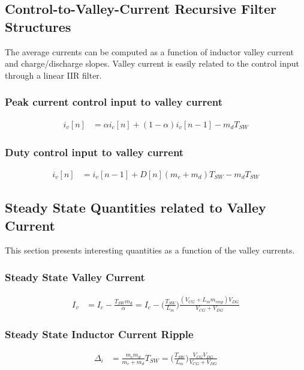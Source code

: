 \documentclass{scrartcl}
\begin{document}
		\subsection{Control-to-Valley-Current Recursive Filter Structures}
		The average currents can be computed as a function of inductor valley current and charge/discharge slopes.  Valley current is easily related to the control input through a linear IIR filter.
		\subsubsection{Peak current control input to valley current}
			\begin{align}
			i_v[n] &=  \alpha i_c[n] + ( 1 - \alpha ) i_v [n-1] - m_dT_{SW}    \label{ivn_cpm}
			\end{align}
		
		\subsubsection{Duty control input to valley current}
			\begin{align}
			i_v[n] &= i_v[n-1] +  D[n](m_c+m_d)T_{SW} - m_dT_{SW}  \label{ivn_dc}	
			\end{align}		
		

	\subsection{Steady State Quantities related to Valley Current}
	This section presents interesting quantities as a function of the valley currents.
	
		\subsubsection{Steady State Valley Current}
			\begin{align}
			I_{v} &=  I_{c} - \frac{T_{SW}m_d} {\alpha} =
			I_c - \bigg(\frac{T_{SW}} {L_m}\bigg) \frac{(V_{CG}+L_m m_{cmp})V_{DG} }{V_{CG}+V_{DG}} \label{ic_to_iv}
			\end{align}
			
		\subsubsection{Steady State Inductor Current Ripple}
			\begin{align}
			\Delta_i &=  \frac{m_c m_d}{m_c + m_d} T_{SW} = \bigg(\frac{T_{SW}} {L_m}\bigg)\frac{V_{CG} V_{DG}}{V_{CG} + V_{DG}}
			\end{align}	
	
\end{document}
